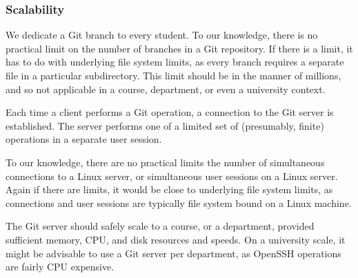 \subsubsection{Scalability}

We dedicate a Git branch to every student. To our knowledge, there is no
practical limit on the number of branches in a Git repository. If there is a
limit, it has to do with underlying file system limits, as every branch
requires a separate file in a particular subdirectory. This limit should be in
the manner of millions, and so not applicable in a course, department, or even
a university context.

Each time a client performs a Git operation, a connection to the Git server is
established. The server performs one of a limited set of (presumably, finite)
operations in a separate user session.

To our knowledge, there are no practical limits the number of simultaneous
connections to a Linux server, or simultaneous user sessions on a Linux server.
Again if there are limits, it would be close to underlying file system limits,
as connections and user sessions are typically file system bound on a Linux
machine.

The Git server should safely scale to a course, or a department, provided
sufficient memory, CPU, and disk resources and speeds. On a university scale,
it might be advisable to use a Git server per department, as OpenSSH operations
are fairly CPU expensive.
